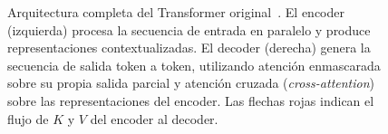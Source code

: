 \begin{figure}[H]
\caption{Arquitectura completa del Transformer original~\cite{vaswani2017attention}.
El encoder (izquierda) procesa la secuencia de entrada en paralelo y produce
representaciones contextualizadas. El decoder (derecha) genera la secuencia
de salida token a token, utilizando atenci\'on enmascarada sobre su propia
salida parcial y atenci\'on cruzada (\textit{cross-attention}) sobre las
representaciones del encoder. Las flechas rojas indican el flujo de $K$ y $V$
del encoder al decoder.}
\label{fig:positional_encoding}
\end{figure}
